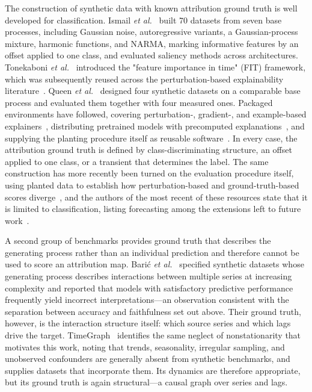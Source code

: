 \documentclass{article}
\begin{document}
The construction of synthetic data with known attribution ground truth is well developed for classification. Ismail \emph{et al.}~\cite{ismail2020} built 70 datasets from seven base processes, including Gaussian noise, autoregressive variants, a Gaussian-process mixture, harmonic functions, and NARMA, marking informative features by an offset applied to one class, and evaluated saliency methods across architectures. Tonekaboni \emph{et al.}~\cite{tonekaboni2020} introduced the "feature importance in time" (FIT) framework, which was subsequently reused across the perturbation-based explainability literature~\cite{crabbe2021,enguehard2023,liu2024}. Queen \emph{et al.}~\cite{queen2023} designed four synthetic datasets on a comparable base process and evaluated them together with four measured ones. Packaged environments have followed, covering perturbation-, gradient-, and example-based explainers~\cite{hollig2023}, distributing pretrained models with precomputed explanations~\cite{explaints2026}, and supplying the planting procedure itself as reusable software~\cite{xaitimesynth2026}. In every case, the attribution ground truth is defined by class-discriminating structure, an offset applied to one class, or a transient that determines the label. The same construction has more recently been turned on the evaluation procedure itself, using planted data to establish how perturbation-based and ground-truth-based scores diverge~\cite{baer2026}, and the authors of the most recent of these resources state that it is limited to classification, listing forecasting among the extensions left to future work~\cite{explaints2026}.
 
A second group of benchmarks provides ground truth that describes the generating process rather than an individual prediction and therefore cannot be used to score an attribution map. Bari\'{c} \emph{et al.}~\cite{baric2021} specified synthetic datasets whose generating process describes interactions between multiple series at increasing complexity and reported that models with satisfactory predictive performance frequently yield incorrect interpretations—an observation consistent with the separation between accuracy and faithfulness set out above. Their ground truth, however, is the interaction structure itself: which source series and which lags drive the target. TimeGraph~\cite{timegraph2025} identifies the same neglect of nonstationarity that motivates this work, noting that trends, seasonality, irregular sampling, and unobserved confounders are generally absent from synthetic benchmarks, and supplies datasets that incorporate them. Its dynamics are therefore appropriate, but its ground truth is again structural—a causal graph over series and lags.
\end{document}
